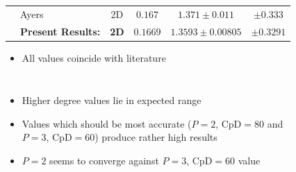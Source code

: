 \begin{frame}[allowframebreaks]
{\begin{minipage}{\the\textwidth}
\begin{table}[htp]
\begin{tabular}{|l|l|c|c|c|c|}
					\rule{0pt}{2,3ex}& Ayers                  & 2D    &$ 0.167$     & $1.371 \pm 0.011 $ &$ \pm 0.333 $\\ \cline{2-6} 
					\rule{0pt}{2,3ex}& \textbf{Present Results:}                   & \textbf{2D}    & $\mathbf{0.1669}$     & $\mathbf{1.3593 \pm 0.00805}$  &  $\mathbf{\pm 0.3291}$ \\ \hline
				\end{tabular}	
			\end{table}
				\end{minipage}
			}
			\vspace{-0.1cm}
			\begin{itemize}
				\item All values coincide with literature
			\end{itemize}
%			
			\begin{columns}[t]
				\column[]{5cm}
				\begin{itemize}
					\item Higher degree values lie in expected range
					\item Values which should be most accurate ($P=2$, $\text{CpD}=80$ and $P=3$, $\text{CpD}=60$) produce rather high results
					\item $P=2$ seems to converge against $P=3$, $\text{CpD}=60$ value
				\end{itemize}
				\column[]{7cm}
				\begin{figure}[htp]
					\centering		
					
				\end{figure}
			\end{columns}
			
		\end{frame}
